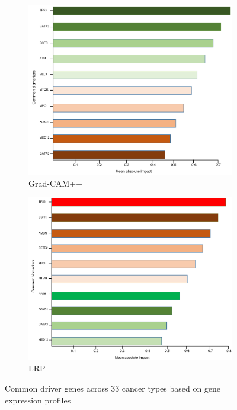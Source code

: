 \begin{figure}
	\centering
	\begin{subfigure}{.48\linewidth}
		\centering
		\includegraphics[scale=0.4]{images/gcam_fi.png}
		\caption{Grad-CAM++}
        \label{fig:comgenegcam}
	\end{subfigure}
	\begin{subfigure}{0.48\linewidth}
		\centering
		\includegraphics[scale=0.4]{images/lrp_fi.png}
		\caption{LRP}
        \label{fig:comgeneglrp}
	\end{subfigure}
	\caption{Common driver genes across 33 cancer types based on gene expression profiles} 
	\label{fig:comgenes}
\end{figure}

